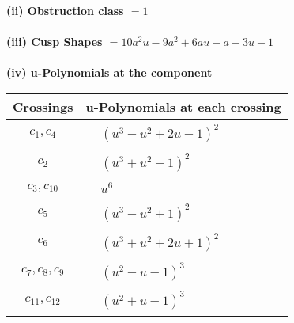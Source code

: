 \documentclass[1p]{elsarticle_modified}
\theoremstyle{definition}
\begin{document}
\flushleft \textbf{(ii) Obstruction class $= 1$}\\~\\
\flushleft \textbf{(iii) Cusp Shapes $= 10 a^2 u-9 a^2+6 a u- a+3 u-1$}\\~\\
\newpage\renewcommand{\arraystretch}{1}
\flushleft \textbf{(iv) u-Polynomials at the component}\newline \\
\begin{tabular}{m{50pt}|m{274pt}}
Crossings & \hspace{64pt}u-Polynomials at each crossing \\
\hline $$\begin{aligned}c_{1},c_{4}\end{aligned}$$&$\begin{aligned}
&(u^3- u^2+2 u-1)^2
\end{aligned}$\\
\hline $$\begin{aligned}c_{2}\end{aligned}$$&$\begin{aligned}
&(u^3+u^2-1)^2
\end{aligned}$\\
\hline $$\begin{aligned}c_{3},c_{10}\end{aligned}$$&$\begin{aligned}
&u^6
\end{aligned}$\\
\hline $$\begin{aligned}c_{5}\end{aligned}$$&$\begin{aligned}
&(u^3- u^2+1)^2
\end{aligned}$\\
\hline $$\begin{aligned}c_{6}\end{aligned}$$&$\begin{aligned}
&(u^3+u^2+2 u+1)^2
\end{aligned}$\\
\hline $$\begin{aligned}c_{7},c_{8},c_{9}\end{aligned}$$&$\begin{aligned}
&(u^2- u-1)^3
\end{aligned}$\\
\hline $$\begin{aligned}c_{11},c_{12}\end{aligned}$$&$\begin{aligned}
&(u^2+u-1)^3
\end{aligned}$\\
\hline
\end{tabular}\\~\\
\end{document}
